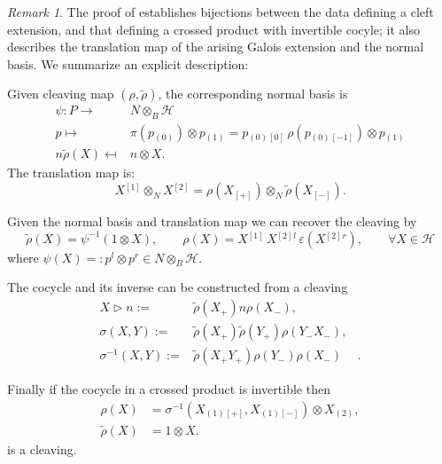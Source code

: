 \documentclass[a4paper,reqno]{amsart}
\numberwithin{equation}{section}
\theoremstyle{plain}
\theoremstyle{remark}
\newtheorem{rem}[thm]{Remark}
\numberwithin{equation}{section}
\newcommand{\ot}{\otimes}
\newcommand{\yi}[1]{{#1}{}{}^{\scriptscriptstyle{[1]}}}
\newcommand{\er}[1]{{#1}{}{}^{\scriptscriptstyle{[2]}}}
\newcommand{\trho}{{\tilde{\rho}}}
\newcommand{\z}{{}_{\scriptscriptstyle{(0)}}}
\newcommand{\rz}{{}_{\scriptscriptstyle{[0]}}}
\renewcommand{\o}{{}_{\scriptscriptstyle{(1)}}}
\newcommand{\rmo}{{}_{\scriptscriptstyle{[-1]}}}
\renewcommand{\t}{{}_{\scriptscriptstyle{(2)}}}
\newcommand\ou[1]{\otimes_{#1}}
\newcommand{\la}{{\triangleright}}
\newcommand{\CH}{\mathcal{H}}
\begin{document}
\begin{rem}\label{rem. concrete correspondence}
    The proof of  establishes bijections between the data defining a cleft extension, and that defining a crossed product with invertible cocyle; it also describes the translation map of the arising Galois extension and the normal basis. We summarize an explicit description:
    
  Given cleaving map $(\rho,\trho)$, the corresponding normal basis is 
    \begin{align*}
        \psi:P\to& N\ot_{B}\CH\\
        p\mapsto& \pi(p\z)\ot p\o= p\z\rz\,\rho(p\z\rmo)\ot p\o\\
        n\trho(X)\mapsfrom& n\ot X.
    \end{align*}
The translation map is:
\[X\yi{}\ot_{N}X\er{}=\rho(X_{[+]})\ot_{N}\trho(X_{[-]}).\]

Given the normal basis and translation map we can recover the cleaving by
 \[\trho(X)=\psi^{-1}(1\ot X),\qquad \rho(X)=X\yi{}\,X\er{}{}^{l}\,\varepsilon(X\er{}{}^{r}),\qquad \forall X\in \CH\]
where $\psi(X)=:p^l\ot p^r\in N\ou B\CH$.

The cocycle and its inverse can be constructed from a cleaving 
    \begin{align*}
        X\la n:=&\trho(X_{+})n\rho(X_{-}),\\
        \sigma(X, Y):=&\trho(X_{+})\trho(Y_{+})\rho(Y_{-}X_{-}),\\
        \sigma^{-1}(X,Y):=&\trho(X_{+}Y_{+})\rho(Y_{-})\rho(X_{-})&.
    \end{align*}

   Finally if the cocycle in a crossed product is invertible then
    \begin{align*}
        \rho(X)&=\sigma^{-1}(X\o{}_{[+]},X\o{}_{[-]})\ot X\t,\\
        \trho(X)&=1\ot X.
    \end{align*}
    is a cleaving.   
\end{rem}
\end{document}
